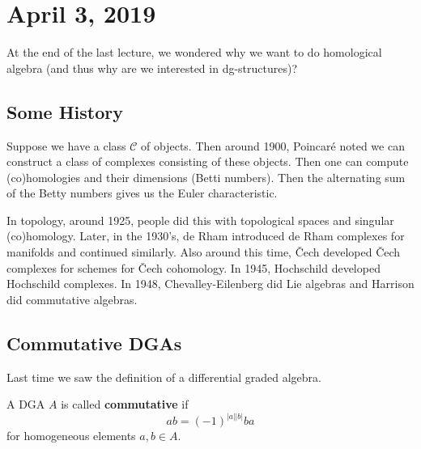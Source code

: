 \documentclass[12pt]{article}
\begin{document}
\section{April 3, 2019}
At the end of the last lecture, we wondered why we want to do homological algebra (and thus why
are we interested in dg-structures)?

\subsection{Some History}
Suppose we have a class $\mathcal C$ of objects. Then around 1900, Poincar\'e noted we can construct 
a class of complexes consisting of these objects. Then one can compute (co)homologies and their dimensions (Betti numbers).
Then the alternating sum of the Betty numbers gives us the Euler characteristic.

In topology, around 1925, people did this with topological spaces and singular (co)homology. Later, in the 1930's, 
de Rham introduced de Rham complexes for manifolds and continued similarly. Also around this time, \v Cech developed 
\v Cech complexes for schemes for \v Cech cohomology. In 1945, Hochschild developed Hochschild complexes.
In 1948, Chevalley-Eilenberg did Lie algebras and Harrison did commutative algebras.

\subsection{Commutative DGAs}
Last time we saw the definition of a differential graded algebra. 
\begin{defn}
	A DGA $A$ is called \textbf{commutative} if 
	\[ab=(-1)^{|a||b|}ba\]
	for homogeneous elements $a,b\in A$.
\end{defn}
\end{document}
